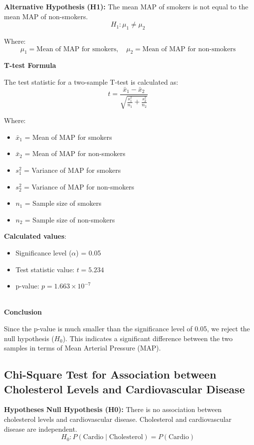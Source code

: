 \documentclass[12pt]{article}
\begin{document}
\textbf{Alternative Hypothesis (H1):} The mean MAP of smokers is not equal to the mean MAP of non-smokers.  
\[
H_1: \mu_1 \neq \mu_2
\]

Where:
\[
\mu_1 = \text{Mean of MAP for smokers}, \quad \mu_2 = \text{Mean of MAP for non-smokers}
\]

\textbf{T-test Formula}

The test statistic for a two-sample T-test is calculated as:
\[
t = \frac{\bar{x}_1 - \bar{x}_2}{\sqrt{\frac{s_1^2}{n_1} + \frac{s_2^2}{n_2}}}
\]

Where:
\begin{itemize}
    \item \(\bar{x}_1\) = Mean of MAP for smokers
    \item \(\bar{x}_2\) = Mean of MAP for non-smokers
    \item \(s_1^2\) = Variance of MAP for smokers
    \item \(s_2^2\) = Variance of MAP for non-smokers
    \item \(n_1\) = Sample size of smokers
    \item \(n_2\) = Sample size of non-smokers
\end{itemize}

\textbf{Calculated values}:
\begin{itemize}
    \item Significance level (\(\alpha\)) = 0.05
    \item Test statistic value: \(t = 5.234\)
    \item p-value: \(p = 1.663 \times 10^{-7}\)
\end{itemize}
\\
\textbf{Conclusion}

Since the p-value is much smaller than the significance level of 0.05, we reject the null hypothesis (\(H_0\)). This indicates a significant difference between the two samples in terms of Mean Arterial Pressure (MAP).

\subsection{Chi-Square Test for Association between Cholesterol Levels and Cardiovascular Disease}

\textbf{Hypotheses}
\textbf{Null Hypothesis (H0):} There is no association between cholesterol levels and cardiovascular disease. Cholesterol and cardiovascular disease are independent.
\[
H_0: P(\text{Cardio} \mid \text{Cholesterol}) = P(\text{Cardio})
\]
\end{document}

